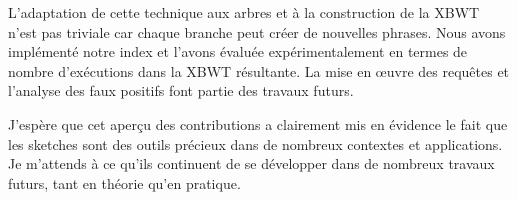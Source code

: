 L'adaptation de cette technique aux arbres et à la construction de la XBWT n'est pas triviale car chaque branche peut créer de nouvelles phrases. Nous avons implémenté notre index et l'avons évaluée expérimentalement en termes de nombre d'exécutions dans la XBWT résultante. La mise en œuvre des requêtes et l'analyse des faux positifs font partie des travaux futurs.

J'espère que cet aperçu des contributions a clairement mis en évidence le fait que les sketches sont des outils précieux dans de nombreux contextes et applications. Je m'attends à ce qu'ils continuent de se développer dans de nombreux travaux futurs, tant en théorie qu'en pratique.